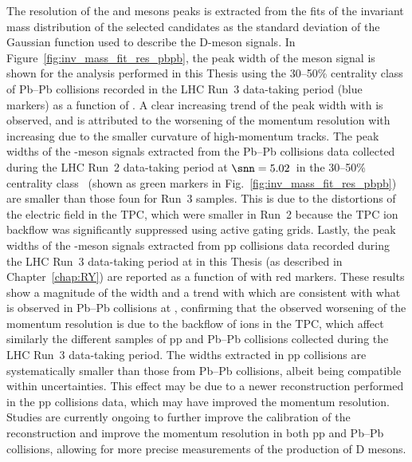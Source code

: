 The resolution of the \ds and \dpl mesons peaks is extracted from the fits of the invariant mass distribution of the selected candidates as the standard deviation of the Gaussian function used to describe the D-meson signals. In Figure~\ref{fig:inv_mass_fit_res_pbpb}, the peak width of the \ds meson signal is shown for the analysis performed in this Thesis using the 30--50\% centrality class of Pb--Pb collisions recorded in the LHC Run~3 data-taking period (blue markers) as a function of \pt. A clear increasing trend of the peak width with \pt is observed, and is attributed to the worsening of the momentum resolution with increasing \pt due to the smaller curvature of high-momentum tracks. The peak widths of the \ds-meson signals extracted from the Pb--Pb collisions data collected during the LHC Run~2 data-taking period at $\snn=5.02$~\tev in the 30--50\% centrality class~\cite{ALICE:2021kfc} (shown as green markers in Fig.~\ref{fig:inv_mass_fit_res_pbpb}) are smaller than those foun for Run~3 samples. This is due to the distortions of the electric field in the TPC, which were smaller in Run~2 because the TPC ion backflow was significantly suppressed using active gating grids. Lastly, the peak widths of the \ds-meson signals extracted from pp collisions data recorded during the LHC Run~3 data-taking period at \thirteen in this Thesis (as described in Chapter~\ref{chap:RY}) are reported as a function of \pt with red markers. These results show a magnitude of the width and a trend with \pt which are consistent with what is observed in Pb--Pb collisions at \fivenn, confirming that the observed worsening of the momentum resolution is due to the backflow of ions in the TPC, which affect similarly the different samples of pp and Pb--Pb collisions collected during the LHC Run~3 data-taking period. The widths extracted in pp collisions are systematically smaller than those from Pb--Pb collisions, albeit being compatible within uncertainties. This effect may be due to a newer reconstruction performed in the pp collisions data, which may have improved the momentum resolution. Studies are currently ongoing to further improve the calibration of the reconstruction and improve the momentum resolution in both pp and Pb--Pb collisions, allowing for more precise measurements of the production of D mesons. 

